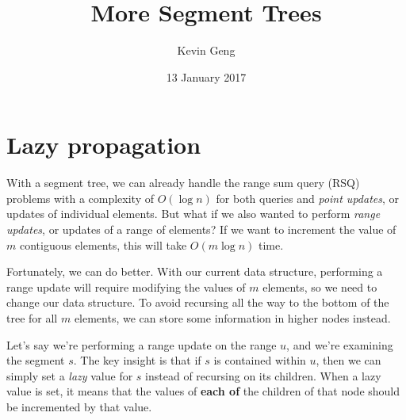 \documentclass{article}
\title{More Segment Trees}
\author{Kevin Geng}
\date{13 January 2017}
\begin{document}
\maketitle

\section{Lazy propagation}
With a segment tree, we can already handle the range sum query (RSQ) problems with a complexity of $O(\log n)$ for both queries and \textit{point updates}, or updates of individual elements. But what if we also wanted to perform \textit{range updates}, or updates of a range of elements? If we want to increment the value of $m$ contiguous elements, this will take $O(m \log n)$ time.

Fortunately, we can do better. With our current data structure, performing a range update will require modifying the values of $m$ elements, so we need to change our data structure. To avoid recursing all the way to the bottom of the tree for all $m$ elements, we can store some information in higher nodes instead.

Let's say we're performing a range update on the range $u$, and we're examining the segment $s$. The key insight is that if $s$ is contained within $u$, then we can simply set a \textit{lazy} value for $s$ instead of recursing on its children. When a lazy value is set, it means that the values of \textbf{each of} the children of that node should be incremented by that value.
\end{document}
